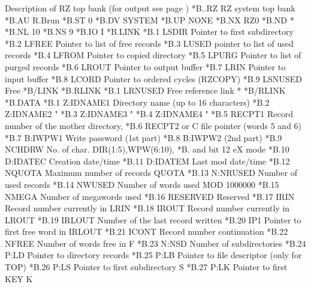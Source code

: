 \newpage

\begin{XMPt}{Description of RZ top bank (for output see page \pageref{xmp:rztop})}
*B..RZ  RZ system top bank
*B.AU   R.Brun
*B.ST   0
*B.DV   SYSTEM
*B.UP   NONE
*B.NX   RZ0
*B.ND   *
*B.NL   10
*B.NS   9
*B.IO   I
*B.LINK
*B.1    LSDIR      Pointer to first subdirectory
*B.2    LFREE      Pointer to list of free records
*B.3    LUSED      pointer to list of used records
*B.4    LFROM      Pointer to copied directory
*B.5    LPURG      Pointer to list of purged records
*B.6    LROUT      Pointer to output buffer
*B.7    LRIN       Pointer to input buffer
*B.8    LCORD      Pointer to ordered cycles (RZCOPY)
*B.9    LSNUSED    Free 
*B/LINK
*B.RLINK
*B.1    LRNUSED    Free reference link                     *
*B/RLINK
*B.DATA
*B.1     Z:IDNAME1     Directory name  (up to 16 characters)    
*B.2     Z:IDNAME2                 "                              
*B.3     Z:IDNAME3                 "                              
*B.4     Z:IDNAME4                 "                              
*B.5     RECPT1        Record number of the mother directory,   
*B.6     RECPT2        or C file pointer (words 5 and 6)        
*B.7     B:IWPW1       Write password (1st part)                
*B.8     B:IWPW2                      (2nd part)                
*B.9     NCHDRW        No. of char. DIR(1:5),WPW(6:10), 
*B.                    and  bit 12 eX mode   
*B.10    D:IDATEC      Creation date/time                       
*B.11    D:IDATEM      Last mod date/time                       
*B.12    NQUOTA        Maximum number of records QUOTA          
*B.13    N:NRUSED      Number of used records                   
*B.14    NWUSED        Number of words used MOD 1000000         
*B.15    NMEGA         Number of megawords used                 
*B.16    RESERVED      Reserved                        
*B.17    IRIN          Record number currently in LRIN          
*B.18    IROUT         Record number currently in LROUT         
*B.19    IRLOUT        Number of the last record written        
*B.20    IP1           Pointer to first free word in IRLOUT     
*B.21    ICONT         Record number continuation               
*B.22    NFREE         Number of words free in F                
*B.23    N:NSD         Number of subdirectories                 
*B.24    P:LD          Pointer to directory records             
*B.25    P:LB          Pointer to file descriptor (only for TOP)
*B.26    P:LS          Pointer to first subdirectory S          
*B.27    P:LK          Pointer to first KEY   K                 

\end{XMPt}
